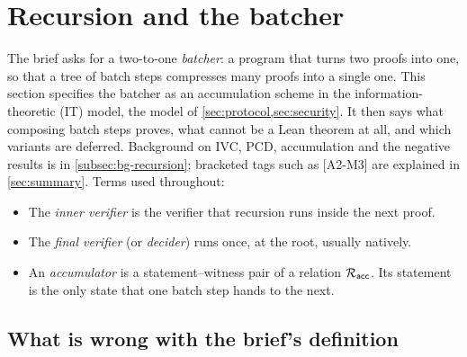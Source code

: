 \section{Recursion and the batcher}\label{sec:recursion}

The brief asks for a two-to-one \emph{batcher}: a program that turns two proofs into one, so that a
tree of batch steps compresses many proofs into a single one. This section specifies the batcher as
an accumulation scheme in the information-theoretic (IT) model, the model of
\cref{sec:protocol,sec:security}. It then says what composing batch steps proves, what cannot be a
Lean theorem at all, and which variants are deferred. Background on IVC, PCD, accumulation and the
negative results is in \cref{subsec:bg-recursion}; bracketed tags such as [A2-M3] are explained in
\cref{sec:summary}. Terms used throughout:
\begin{itemize}[nosep]
\item The \emph{inner verifier} is the verifier that recursion runs inside the next proof.
\item The \emph{final verifier} (or \emph{decider}) runs once, at the root, usually natively.
\item An \emph{accumulator} is a statement--witness pair of a relation $\mathcal{R}_{\mathsf{acc}}$. Its statement is the
  only state that one batch step hands to the next.
\end{itemize}

\subsection{What is wrong with the brief's definition}\label{subsec:rec-critique}

